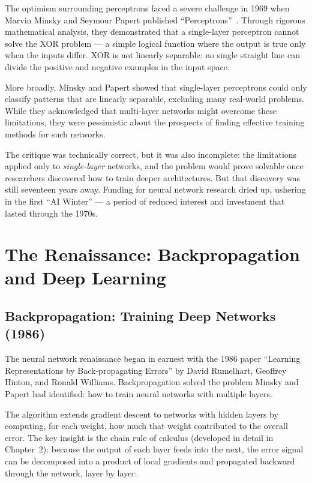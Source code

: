 \documentclass{book}
\begin{document}
The optimism surrounding perceptrons faced a severe challenge in 1969 when
Marvin Minsky and Seymour Papert published ``Perceptrons''~\cite{minsky1969perceptrons}.
Through rigorous mathematical analysis, they demonstrated that a single-layer
perceptron cannot solve the XOR problem --- a simple logical function where
the output is true only when the inputs differ. XOR is not linearly separable:
no single straight line can divide the positive and negative examples in the
input space.

More broadly, Minsky and Papert showed that single-layer perceptrons could
only classify patterns that are linearly separable, excluding many real-world
problems. While they acknowledged that multi-layer networks might overcome
these limitations, they were pessimistic about the prospects of finding
effective training methods for such networks.

The critique was technically correct, but it was also incomplete: the
limitations applied only to \emph{single-layer} networks, and the problem
would prove solvable once researchers discovered how to train deeper
architectures. But that discovery was still seventeen years away. Funding
for neural network research dried up, ushering in the first ``AI Winter'' ---
a period of reduced interest and investment that lasted through the 1970s.

\section{The Renaissance: Backpropagation and Deep Learning}

\subsection{Backpropagation: Training Deep Networks (1986)}
\label{sec:backprop}

The neural network renaissance began in earnest with the 1986 paper
\cite{rumelhart1986learning} ``Learning Representations by Back-propagating
Errors'' by David Rumelhart, Geoffrey Hinton, and Ronald Williams.
Backpropagation solved the problem Minsky and Papert had identified: how to
train neural networks with multiple layers.

The algorithm extends gradient descent to networks with hidden layers by
computing, for each weight, how much that weight contributed to the overall
error. The key insight is the chain rule of calculus (developed in detail in
Chapter~2): because the output of each layer feeds into the next, the error
signal can be decomposed into a product of local gradients and propagated
backward through the network, layer by layer:
\end{document}
